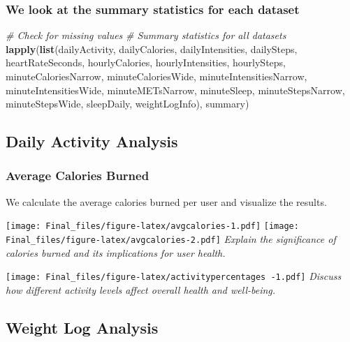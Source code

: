 \documentclass[
]{article}
\newenvironment{Shaded}{\begin{snugshade}}{\end{snugshade}}
\newcommand{\CommentTok}[1]{\textcolor[rgb]{0.56,0.35,0.01}{\textit{#1}}}
\newcommand{\FunctionTok}[1]{\textcolor[rgb]{0.13,0.29,0.53}{\textbf{#1}}}
\newcommand{\NormalTok}[1]{#1}
\begin{document}
\hypertarget{we-look-at-the-summary-statistics-for-each-dataset}{%
\subsubsection{We look at the summary statistics for each
dataset}\label{we-look-at-the-summary-statistics-for-each-dataset}}

\begin{Shaded}
\begin{Highlighting}[]
\CommentTok{\# Check for missing values}
\CommentTok{\# Summary statistics for all datasets}
\FunctionTok{lapply}\NormalTok{(}\FunctionTok{list}\NormalTok{(dailyActivity, dailyCalories, dailyIntensities, dailySteps,}
\NormalTok{            heartRateSeconds, hourlyCalories, hourlyIntensities,}
\NormalTok{            hourlySteps, minuteCaloriesNarrow, minuteCaloriesWide,}
\NormalTok{            minuteIntensitiesNarrow, minuteIntensitiesWide,}
\NormalTok{            minuteMETsNarrow, minuteSleep, minuteStepsNarrow,}
\NormalTok{            minuteStepsWide, sleepDaily, weightLogInfo), summary)}
\end{Highlighting}
\end{Shaded}

\hypertarget{daily-activity-analysis}{%
\subsection{Daily Activity Analysis}\label{daily-activity-analysis}}

\hypertarget{average-calories-burned}{%
\subsubsection{Average Calories Burned}\label{average-calories-burned}}

We calculate the average calories burned per user and visualize the
results.

\texttt{[image: Final\_files/figure-latex/avgcalories-1.pdf]}
\texttt{[image: Final\_files/figure-latex/avgcalories-2.pdf]}
\emph{Explain the significance of calories burned and its implications
for user health.}

\texttt{[image: Final\_files/figure-latex/activitypercentages -1.pdf]}
\emph{Discuss how different activity levels affect overall health and
well-being.}

\hypertarget{weight-log-analysis}{%
\subsection{Weight Log Analysis}\label{weight-log-analysis}}
\end{document}
